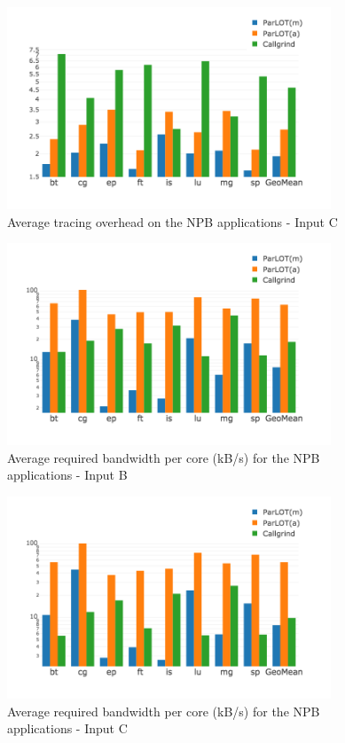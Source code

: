 \begin{figure}[t]
\centering
\includegraphics[width=3.8in]{figs.comet.newMed/comet_chartAvg_sd_C_p3_5.png}
\caption{ Average tracing overhead on the NPB applications - Input C}
\label{comet_chartAvg_sd_C_p3_5}
\end{figure}


\begin{figure}[t]
\centering
\includegraphics[width=3.8in]{figs.comet.newMed/comet_chartAvg_bw_B_p3_5.png}
\caption{  Average required bandwidth per core (kB/s) for the NPB applications - Input B}
\label{comet_chartAvg_bw_B_p3_5}
\end{figure}

\begin{figure}[t]
\centering
\includegraphics[width=3.8in]{figs.comet.newMed/comet_chartAvg_bw_C_p3_5.png}
\caption{ Average required bandwidth per core (kB/s) for the NPB applications - Input C}
\label{comet_chartAvg_bw_C_p3_5}
\end{figure}

